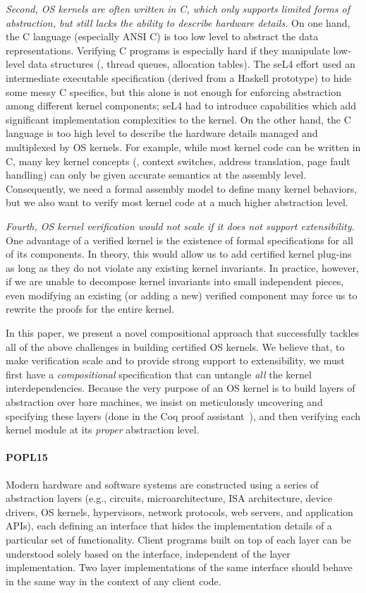 {\em Second, OS kernels are often written in C, which only supports
  limited forms of abstraction,
  but still lacks the ability to describe hardware details.}
On one hand, the C language (especially ANSI C) is
  too low level to abstract the data representations.
Verifying C programs is
especially hard if they manipulate low-level data structures (\eg,
thread queues, allocation tables). The seL4 effort used an
intermediate executable specification (derived from a Haskell
prototype) to hide some messy C specifics, but this alone is not
enough for enforcing abstraction among different kernel components;
seL4 had to introduce capabilities which add significant
implementation complexities to the kernel.
On the other hand, the C language is
too high level to describe the hardware details
managed and multiplexed by OS kernels.
For example, while most kernel code
can be written in C, many key kernel concepts (\eg, context switches,
address translation, page fault handling) can only be given accurate
semantics at the assembly level. Consequently, we need a formal
assembly model to define many kernel behaviors, but we also want to
verify most kernel code at a much higher abstraction level.

{\em Fourth, OS kernel verification would not scale if it does not 
support extensibility.} One advantage of a verified
kernel is the existence of formal specifications for all of its
components. In theory, this would allow us to add certified
kernel plug-ins
~\cite{shao10:ctos} 
as long as they do not violate any existing kernel invariants. In
practice, however, if we are unable to decompose kernel invariants
into small independent pieces, even modifying an existing (or adding a
new) verified component may force us to rewrite the proofs for the
entire kernel.

In this paper, we present a novel compositional approach that
successfully tackles all of the above challenges in building certified
OS kernels. We believe that, to make verification scale and to provide
strong support to extensibility, we must first have a {\em
  compositional} specification that can untangle {\em all} the kernel
interdependencies. Because the very purpose of an OS kernel is to
build layers of abstraction over bare machines, we insist on
meticulously uncovering and specifying these layers (done in the Coq
proof assistant~\cite{coq}), and then verifying each kernel module at
its {\em proper} abstraction level.


\paragraph{POPL15}
Modern hardware and software systems are constructed using a series of
abstraction layers (e.g., circuits, microarchitecture, ISA
architecture, device drivers, OS kernels, hypervisors, network
protocols, web servers, and application APIs), each defining
an interface that hides the implementation details of a particular set
of functionality.  Client programs built on top of each layer can be
understood solely based on the interface, independent of the layer
implementation. Two layer implementations of the same interface should
behave in the same way in the context of any client code.

